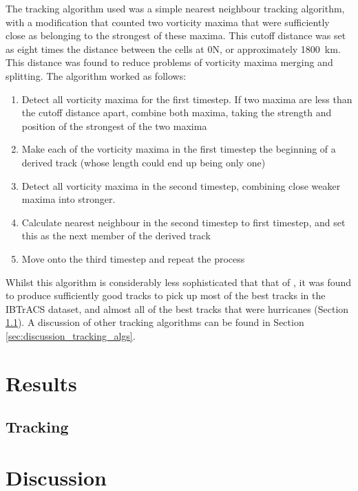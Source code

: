 \documentclass[pdftex,12pt,a4paper]{report}
\begin{document}
The tracking algorithm used was a simple nearest neighbour tracking algorithm, with a modification that counted two vorticity maxima that were sufficiently close as belonging to the strongest of these maxima. This cutoff distance was set as eight times the distance between the cells at 0\textdegree N, or approximately \SI{1800}{km}. This distance was found to reduce problems of vorticity maxima merging and splitting. The algorithm worked as follows:

\begin{enumerate}
    \item Detect all vorticity maxima for the first timestep. If two maxima are less than the cutoff distance apart, combine both maxima, taking the strength and position of the strongest of the two maxima
    \item Make each of the vorticity maxima in the first timestep the beginning of a derived track (whose length could end up being only one)
    \item Detect all vorticity maxima in the second timestep, combining close weaker maxima into stronger.
    \item Calculate nearest neighbour in the second timestep to first timestep, and set this as the next member of the derived track
    \item Move onto the third timestep and repeat the process
\end{enumerate}

Whilst this algorithm is considerably less sophisticated that that of \textcite{hodges1994}, it was found to produce sufficiently good tracks to pick up most of the best tracks in the IBTrACS dataset, and almost all of the best tracks that were hurricanes (Section  \ref{sec:results_tracking}). A discussion of other tracking algorithms can be found in Section \ref{sec:discussion_tracking_algs}.

\chapter{Results}

\section{Tracking}
\label{sec:results_tracking}

\chapter{Discussion}
\end{document}
